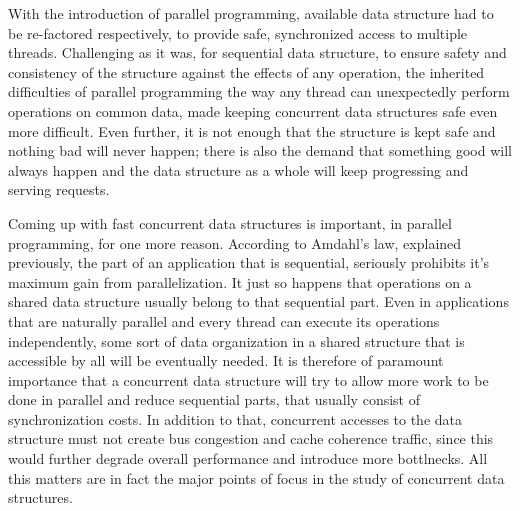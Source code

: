 With the introduction of parallel programming,  available data structure had to be re-factored respectively, to provide safe, synchronized access to multiple threads. Challenging as it was, for sequential data structure, to ensure safety and consistency of the structure against the effects of any operation, the inherited difficulties of parallel programming the way any thread can unexpectedly perform operations on common data, made keeping concurrent data structures safe even more difficult. Even further, it is not enough that the structure is kept safe and nothing bad will never happen; there is also the demand that something good will always happen and the data structure as a whole will keep progressing and serving requests. 

Coming up with fast concurrent data structures is  important, in parallel programming, for one more reason. According to Amdahl's law, explained previously, the part of an application that is sequential, seriously prohibits it's maximum gain from parallelization. It just so happens that operations on a shared data structure usually belong to that sequential part. Even in applications that are naturally parallel and every thread can execute its operations independently, some sort of data organization in a shared structure that is accessible by all will be eventually needed.  It is therefore of paramount importance that a concurrent data structure will try to allow more work to be done in parallel and reduce sequential parts, that usually consist of synchronization costs. In addition to that, concurrent accesses to the data structure must not create bus congestion and cache coherence traffic, since this would further degrade overall performance and introduce more bottlnecks. All this matters are in fact the major points of focus in the study of concurrent data structures. %



